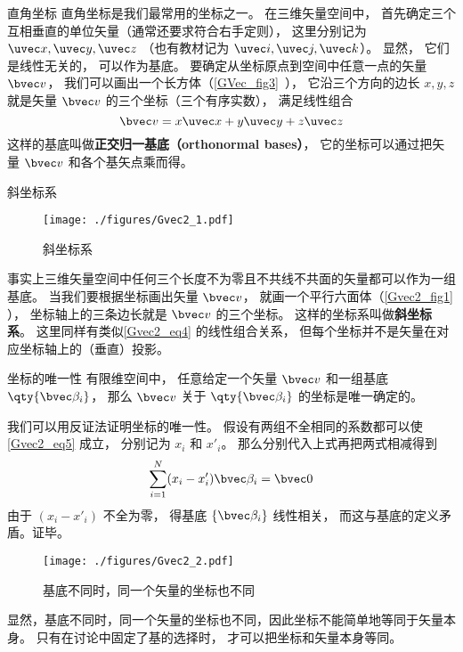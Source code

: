 \begin{example}{直角坐标}
直角坐标是我们最常用的坐标之一。 在三维矢量空间中， 首先确定三个互相垂直的单位矢量（通常还要求符合右手定则）， 这里分别记为 $\uvec x, \uvec y, \uvec z$ （也有教材记为 $\uvec i, \uvec j, \uvec k$）。 显然， 它们是线性无关的， 可以作为基底。 要确定从坐标原点到空间中任意一点的矢量 $\bvec v$， 我们可以画出一个长方体（\autoref{GVec_fig3}~）， 它沿三个方向的边长 $x, y, z$ 就是矢量 $\bvec v$ 的三个坐标（三个有序实数）， 满足线性组合
\begin{equation}\label{Gvec2_eq4}
\bvec v = x\uvec x + y\uvec y + z\uvec z
\end{equation}
这样的基底叫做\textbf{正交归一基底（orthonormal bases）}， 它的坐标可以通过把矢量 $\bvec v$ 和各个基矢点乘而得。
\end{example}

\begin{example}{斜坐标系}\label{Gvec2_ex1}
\begin{figure}[ht]
\centering
\texttt{[image: ./figures/Gvec2\_1.pdf]}
\caption{斜坐标系} \label{Gvec2_fig1}
\end{figure}
事实上三维矢量空间中任何三个长度不为零且不共线不共面的矢量都可以作为一组基底。 当我们要根据坐标画出矢量 $\bvec v$， 就画一个平行六面体（\autoref{Gvec2_fig1} ）， 坐标轴上的三条边长就是 $\bvec v$ 的三个坐标。 这样的坐标系叫做\textbf{斜坐标系}。 这里同样有类似\autoref{Gvec2_eq4} 的线性组合关系， 但每个坐标并不是矢量在对应坐标轴上的（垂直）投影。
\end{example}

\begin{theorem}{坐标的唯一性}
有限维空间中， 任意给定一个矢量 $\bvec v$ 和一组基底 $\qty{\bvec \beta_i}$， 那么 $\bvec v$ 关于 $\qty{\bvec \beta_i}$ 的坐标是唯一确定的。
\end{theorem}
我们可以用反证法证明坐标的唯一性。 假设有两组不全相同的系数都可以使\autoref{Gvec2_eq5} 成立， 分别记为 $x_i$ 和 $x'_i$。 那么分别代入上式再把两式相减得到
\begin{equation}
\sum_{i=1}^N (x_i-x'_i) \bvec \beta_i = \bvec 0
\end{equation}
由于 $(x_i-x'_i)$ 不全为零， 得基底 $\{\bvec \beta_i\}$ 线性相关， 而这与基底的定义矛盾。证毕。
\begin{figure}[ht]
\centering
\texttt{[image: ./figures/Gvec2\_2.pdf]}
\caption{基底不同时，同一个矢量的坐标也不同} \label{Gvec2_fig2}
\end{figure}
显然，基底不同时，同一个矢量的坐标也不同，因此坐标不能简单地等同于矢量本身。 只有在讨论中固定了基的选择时， 才可以把坐标和矢量本身等同。

